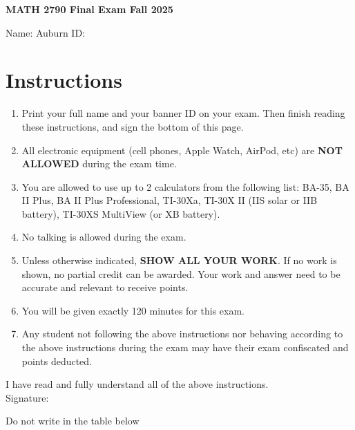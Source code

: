 \documentclass[12pt]{article}
\begin{document}
\begin{center}
    \Large \textbf{MATH 2790 Final Exam Fall 2025} \\[1em]
\end{center}

\vspace{.25cm}

\noindent Name: \underline{\hspace{8cm}} \hspace{.25cm} Auburn ID: \underline{\hspace{4cm}}



\section*{Instructions}
\begin{enumerate}[label=\arabic*.]
\item Print your full name and your banner ID on your exam. Then finish reading these instructions, and sign the bottom of this page.
\item All electronic equipment (cell phones, Apple Watch, AirPod, etc) are \textbf{NOT ALLOWED} during the exam time.
\item You are allowed to use up to 2 calculators from the following list: BA-35, BA II Plus, BA II Plus Professional, TI-30Xa, TI-30X II (IIS solar or IIB battery), TI-30XS MultiView (or XB battery).
\item No talking is allowed during the exam.
\item Unless otherwise indicated, \textbf{SHOW ALL YOUR WORK}. If no work is shown, no partial credit can be awarded. Your work and answer need to be accurate and relevant to receive points.
\item You will be given exactly 120 minutes for this exam.
\item Any student not following the above instructions nor behaving according to the above instructions during the exam may have their exam confiscated and points deducted.
\end{enumerate}

I have read and fully understand all of the above instructions. \\[2em]
Signature: \hrulefill


\vspace{.75cm}
Do not write in the table below
\end{document}
